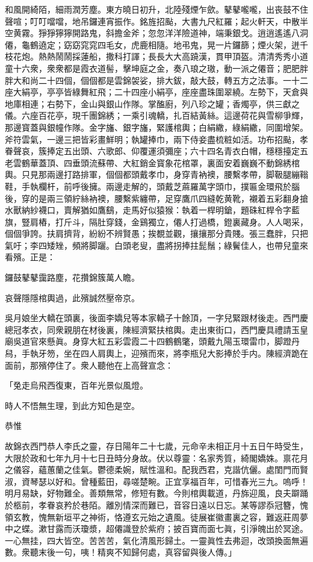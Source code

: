 \begin{myquote}
和風開綺陌，細雨潤芳塵。東方曉日初升，北陸殘煙乍歛。鼕鼕嚨嚨，出丧鼓不住聲喧；叮叮噹噹，地吊鑼連宵振作。銘旌招颭，大書九尺紅羅；起火軒天，中散半空黄霧。猙猙獰獰開路鬼，斜擔金斧；忽忽洋洋險道神，端秉銀戈。逍逍遙遙八洞僊，龜鶴遶定；窈窈窕窕四毛女，虎鹿相隨。地弔鬼，晃一片鑼篩；煙火架，迸千枝花炮。熱熱鬧鬧採蓮船，撒科打諢；長長大大高蹺漢，貫甲頂盔。清清秀秀小道童十六衆，衆衆都是霞衣道髻，擊坤庭之金，奏八琅之璈，動一派之僊音；肥肥胖胖大和尚二十四個，個個都是雲錦袈娑，排大鈸，敲大鼓，轉五方之法事。一十二座大絹亭，亭亭皆綠舞紅飛；二十四座小絹亭，座座盡珠圍翠繞。左勢下，天倉與地庫相連；右勢下，金山與銀山作隊。掌醢廚，列八珍之罐；香燭亭，供三獻之儀。六座百花亭，現千團錦綉；一乘引魂轎，扎百結黃絲。這邊荷花與雪柳爭輝，那邊寳蓋與銀幢作隊。金字旛、銀字旛，緊護棺輿；白絹繖，綠絹繖，同圍增架。斧符雲氣，一邊三把皆彩畫鮮明；執罐捧巾，兩下侍妾盡梳粧如活。功布招颭，孝眷聲哀，簇捧定五出頭、六歌郎、仰覆運須彌座；六十四名青衣白帽，穩穩擡定五老雲鶴華蓋頂、四垂頭流蘇帶、大紅銷金寳象花棺罩，裏面安着巍巍不動錦綉棺輿。只見那兩邊打路排軍，個個都頭戴孝巾，身穿青衲襖，腰繫孝帶，脚靸腿繃䩺鞋，手執欄杆，前呼後擁。兩邊走解的，頭戴芝蔴羅萬字頭巾，撲匾金環飛於腦後，穿的是兩三領紵絲衲襖，腰繫紫纏帶，足穿鷹爪四縫乾黄靴，襯着五彩翻身搶水獸納紗襪口，賣解猶如鷹鷂，走馬好似猿猴：執着一桿明鎗，題硃紅桿令字藍旗，豎肩樁，打斤斗，隔肚穿錢，金鷄獨立，僊人打過橋，鐙裏藏身。人人喝采，個個爭誇。扶肩擠背，紛紛不辨賢愚；挨覩並觀，攘攘那分貴賤。張三蠢胖，只把氣吁；李四矮矬，頻將脚躧。白頭老叟，盡將拐捧拄髭鬚；綠鬢佳人，也帶兒童來看殯。正是：

鑼鼓鼕鼕靄路塵，花攢錦簇萬人瞻。

哀聲隱隱棺輿過，此殯誠然壓帝京。
\end{myquote}

吳月娘坐大轎在頭裏，後面李嬌兒等本家轎子十餘頂，一字兒緊跟材後走。西門慶總冠孝衣，同衆親朋在材後裏，陳經濟緊扶棺輿。走出東街口，西門慶具禮請玉皇廟吳道官來懸眞。身穿大紅五彩雲霞二十四鶴鶴氅，頭戴九陽玉環雷巾，脚蹬丹舄，手執牙笏，坐在四人肩輿上，迎殯而來，將李瓶兒大影捧於手内。陳經濟跪在面前，那殯停住了。衆人聽他在上高聲宣念：

\begin{myquote}
「兔走烏飛西復東，百年光景似風燈。

時人不悟無生理，到此方知色是空。

恭惟

故錦衣西門恭人李氏之靈，存日陽年二十七歲，元命辛未相正月十五日午時受生，大限於政和七年九月十七日丑時分身故。伏以尊靈：名家秀質，綺閣嬌姝。禀花月之儀容，蘊蕙蘭之佳氣。鬱德柔婉，賦性溫和。配我西君，克諧伉儷。處閨門而賢淑，資琴瑟以好和。曾種藍田，尋嗟楚畹。正宜享福百年，可惜春光三九。嗚呼！明月易缺，好物難全。善類無常，修短有數。今則棺輿載道，丹旆迎風，良夫躃踊於柩前，孝眷哀矜於巷陌。離別情深而難已，音容日遠以日忘。某等謬忝冠簪，愧領玄教，愧無新垣平之神術，恪遵玄元始之遺風。徒展崔徽畫裏之容，難返莊周夢中之蝶。漱甘露而沃瓊漿，超僊識登於紫府；披百寶而面七眞，引淨魄出於冥途。一心無挂，四大皆空。苦苦苦，氣化清風形歸土。一靈眞性去弗迴，改頭換面無遍數。衆聽末後一句，咦！精爽不知歸何處，真容留與後人傳。」
\end{myquote}

